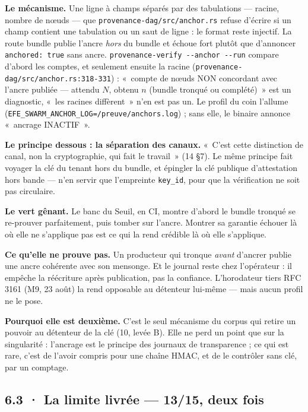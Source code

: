 \documentclass[10pt]{article}
\newcommand{\code}[1]{\texttt{\small #1}}
\newcommand{\loc}[1]{{\footnotesize\color{grey}\texttt{#1}}}
\begin{document}
\textbf{Le mécanisme.} Une ligne à champs séparés par des tabulations --- racine, nombre de nœuds --- que
\code{provenance-dag/\allowbreak src/\allowbreak anchor.rs} refuse d'écrire si un champ contient une tabulation ou un saut de ligne : le
format reste injectif. La route bundle publie l'ancre \emph{hors} du bundle et échoue fort plutôt que d'annoncer
\code{anchored: true} sans ancre. \code{provenance-verify -{}-anchor -{}-run} compare d'abord les comptes, et
seulement ensuite la racine (\loc{provenance-dag/\allowbreak src/\allowbreak anchor.rs:318-331}) : «~compte de nœuds NON concordant avec
l'ancre publiée --- attendu $N$, obtenu $n$ (bundle tronqué ou complété)~» est un diagnostic, «~les racines
diffèrent~» n'en est pas un. Le profil du coin l'allume (\code{EFE\_SWARM\_ANCHOR\_LOG=\allowbreak/preuve/\allowbreak anchors.log}) ; sans elle, le binaire annonce
«~ancrage INACTIF~».

\textbf{Le principe dessous : la séparation des canaux.} «~C'est cette distinction de canal, non la cryptographie,
qui fait le travail~» (14 §7). Le même principe fait voyager la clé du tenant hors du bundle, et épingler la clé
publique d'attestation hors bande --- n'en servir que l'empreinte \code{key\_id}, pour que la vérification ne soit pas
circulaire.

\textbf{Le vert gênant.} Le banc du Seuil, en CI, montre d'abord le bundle tronqué se re-prouver parfaitement, puis
tomber sur l'ancre. Montrer sa garantie échouer là où elle ne s'applique pas est ce qui la rend crédible là où elle
s'applique.

\textbf{Ce qu'elle ne prouve pas.} Un producteur qui tronque \emph{avant} d'ancrer publie une ancre cohérente avec son
mensonge. Et le journal reste chez l'opérateur : il empêche la réécriture après publication, pas la confiance.
L'horodateur tiers RFC 3161 (M9, 23 août) la rend opposable au détenteur lui-même --- mais aucun profil ne le pose.

\textbf{Pourquoi elle est deuxième.} C'est le seul mécanisme du corpus qui retire un pouvoir au détenteur de la clé
(10, levée B). Elle ne perd un point que sur la singularité : l'ancrage est le principe des journaux de
transparence ; ce qui est rare, c'est de l'avoir compris pour une chaîne HMAC, et de le contrôler sans clé, par un
comptage.

\subsection{6.3 · La limite livrée --- 13/15, deux fois}
\end{document}
